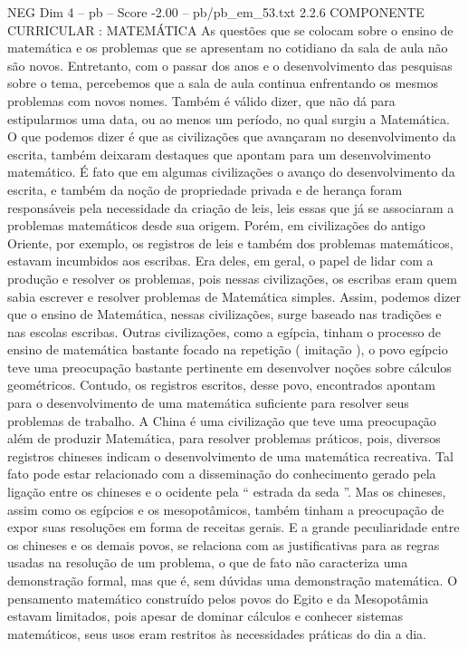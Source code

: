 \begin{textsample}{NEG Dim 4 – pb – Score -2.00 – pb/pb\_em\_53.txt}  \label{ex:f4_neg_030}
2.2.6 COMPONENTE CURRICULAR : MATEMÁTICA As questões que se colocam sobre o ensino de matemática e os problemas que se apresentam no cotidiano da sala de aula não são novos.
Entretanto, com o passar dos anos e o desenvolvimento das pesquisas sobre o tema, percebemos que a sala de aula continua enfrentando os mesmos problemas com novos nomes.
Também é válido dizer, que não dá para estipularmos uma data, ou ao menos um período, no qual surgiu a Matemática.
O que podemos dizer é que as civilizações que avançaram no desenvolvimento da escrita, também deixaram destaques que apontam para um desenvolvimento matemático.
É fato que em algumas civilizações o avanço do desenvolvimento da escrita, e também da noção de propriedade privada e de herança foram responsáveis pela necessidade da criação de leis, leis essas que já se associaram a problemas matemáticos desde sua origem.
Porém, em civilizações do antigo Oriente, por exemplo, os registros de leis e também dos problemas matemáticos, estavam incumbidos aos escribas.
Era deles, em geral, o papel de lidar com a produção e resolver os problemas, pois nessas civilizações, os escribas eram quem sabia escrever e resolver problemas de Matemática simples.
Assim, podemos dizer que o ensino de Matemática, nessas civilizações, surge baseado nas tradições e nas escolas escribas.
Outras civilizações, como a egípcia, tinham o processo de ensino de matemática bastante focado na repetição ( imitação ), o povo egípcio teve uma preocupação bastante pertinente em desenvolver noções sobre cálculos geométricos.
Contudo, os registros escritos, desse povo, encontrados apontam para o desenvolvimento de uma matemática suficiente para resolver seus problemas de trabalho.
A China é uma civilização que teve uma preocupação além de produzir Matemática, para resolver problemas práticos, pois, diversos registros chineses indicam o desenvolvimento de uma matemática recreativa.
Tal fato pode estar relacionado com a disseminação do conhecimento gerado pela ligação entre os chineses e o ocidente pela “ estrada da seda ”.
Mas os chineses, assim como os egípcios e os mesopotâmicos, também tinham a preocupação de expor suas resoluções em forma de receitas gerais.
E a grande peculiaridade entre os chineses e os demais povos, se relaciona com as justificativas para as regras usadas na resolução de um problema, o que de fato não caracteriza uma demonstração formal, mas que é, sem dúvidas uma demonstração matemática.
O pensamento matemático construído pelos povos do Egito e da Mesopotâmia estavam limitados, pois apesar de dominar cálculos e conhecer sistemas matemáticos, seus usos eram restritos às necessidades práticas do dia a dia.

\end{textsample}
